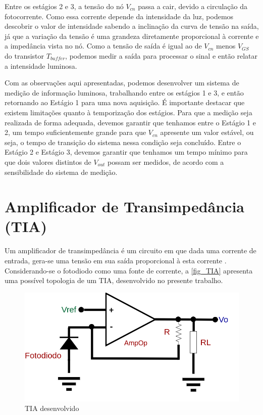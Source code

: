 Entre os est\'agios 2 e 3, a tensão do n\'o $V_{cn}$ passa a cair, devido a circulação da fotocorrente. Como essa corrente depende da intensidade da luz, podemos descobrir o valor de intensidade sabendo a inclinação da curva de tensão na sa\'ida, j\'a que a variação da tensão \'e uma grandeza diretamente proporcional à corrente e a imped\^ancia vista no n\'o. Como a tensão de sa\'ida \'e igual ao de $V_{cn}$ menos $V_{GS}$ do transistor $T_{buffer}$, podemos medir a sa\'ida para processar o sinal e então relatar a intensidade luminosa.

Com as observações aqui apresentadas, podemos desenvolver um sistema de medição de informação luminosa, trabalhando entre os est\'agios 1 e 3, e então retornando ao Estágio 1 para uma nova aquisição. \'E importante destacar que existem limitações quanto \`a temporização dos est\'agios. Para que a medição seja realizada de forma adequada, devemos garantir que tenhamos entre o Est\'agio 1 e 2, um tempo suficientemente grande para que $V_{cn}$ apresente um valor estável, ou seja, o tempo de transição do sistema nessa condição seja conclu\'ido. Entre o Est\'agio 2 e Est\'agio 3, devemos garantir que tenhamos um tempo mínimo para que dois valores distintos de $V_{out}$ possam ser medidos, de acordo com a sensibilidade do sistema de medição.

\section{Amplificador de Transimped\^ancia (TIA)}
\label{section:TIA}

Um amplificador de transimped\^ancia \'e um circuito em que dada uma corrente de entrada, gera-se uma tensão em sua sa\'ida proporcional \`a esta corrente \cite{RazaviFundM}. Considerando-se o fotodiodo como uma fonte de corrente, a \autoref{fig_TIA} apresenta uma poss\'ivel topologia de um TIA, desenvolvido no presente trabalho.

\begin{figure}[!h]
	\caption{\label{fig_TIA}TIA desenvolvido}
	\begin{center}
	    \includegraphics[scale=0.3]{Circuitos/TIA.png}
	\end{center}
\end{figure}

